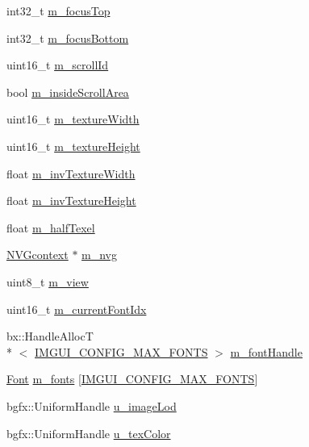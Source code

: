 \begin{DoxyCompactItemize}
\item 
int32\+\_\+t \hyperlink{struct_imgui_a5b80f664bae3b24856f1e6f7ee997689}{m\+\_\+focus\+Top}
\item 
int32\+\_\+t \hyperlink{struct_imgui_ac240b307ef0daa1811a9990eb9e2fb4e}{m\+\_\+focus\+Bottom}
\item 
uint16\+\_\+t \hyperlink{struct_imgui_a30e8e81ea0ea2ceaaa9b495d7a93626a}{m\+\_\+scroll\+Id}
\item 
bool \hyperlink{struct_imgui_a7e1c85bf483a1096a09883f2993b54c9}{m\+\_\+inside\+Scroll\+Area}
\item 
uint16\+\_\+t \hyperlink{struct_imgui_a3851776e5fae774bbb128200ae886bcb}{m\+\_\+texture\+Width}
\item 
uint16\+\_\+t \hyperlink{struct_imgui_a13ed484d71e4e612c09ef37a793901b7}{m\+\_\+texture\+Height}
\item 
float \hyperlink{struct_imgui_a28072d6c7fc1eba7c4d26884d2cce6b9}{m\+\_\+inv\+Texture\+Width}
\item 
float \hyperlink{struct_imgui_a97a4abcedda839b676903c01cdacd3b3}{m\+\_\+inv\+Texture\+Height}
\item 
float \hyperlink{struct_imgui_a9f904b90c3c63bd0e5f611dcab6ae0c9}{m\+\_\+half\+Texel}
\item 
\hyperlink{struct_n_v_gcontext}{N\+V\+Gcontext} $\ast$ \hyperlink{struct_imgui_a9e19f6927feb38c0736babf2ef908e11}{m\+\_\+nvg}
\item 
uint8\+\_\+t \hyperlink{struct_imgui_a5b3df19de612269c5f48ebe7eb904052}{m\+\_\+view}
\item 
uint16\+\_\+t \hyperlink{struct_imgui_ae5864284805ff93aa9f823e4400f9699}{m\+\_\+current\+Font\+Idx}
\item 
bx\+::\+Handle\+Alloc\+T\\*
$<$ \hyperlink{imgui_8cpp_a3af1d21ef7ab72a041fbfec717423f71}{I\+M\+G\+U\+I\+\_\+\+C\+O\+N\+F\+I\+G\+\_\+\+M\+A\+X\+\_\+\+F\+O\+N\+T\+S} $>$ \hyperlink{struct_imgui_a5e2a8ede1963b850515781425f730373}{m\+\_\+font\+Handle}
\item 
\hyperlink{struct_imgui_1_1_font}{Font} \hyperlink{struct_imgui_ac6afbf99733c4ae9446120bd13549b51}{m\+\_\+fonts} \mbox{[}\hyperlink{imgui_8cpp_a3af1d21ef7ab72a041fbfec717423f71}{I\+M\+G\+U\+I\+\_\+\+C\+O\+N\+F\+I\+G\+\_\+\+M\+A\+X\+\_\+\+F\+O\+N\+T\+S}\mbox{]}
\item 
bgfx\+::\+Uniform\+Handle \hyperlink{struct_imgui_a30263cbb0979de658a5075d42f6194c3}{u\+\_\+image\+Lod}
\item 
bgfx\+::\+Uniform\+Handle \hyperlink{struct_imgui_afa78c96bf20f3b39f798596df31b1064}{u\+\_\+tex\+Color}

\end{DoxyCompactItemize}
